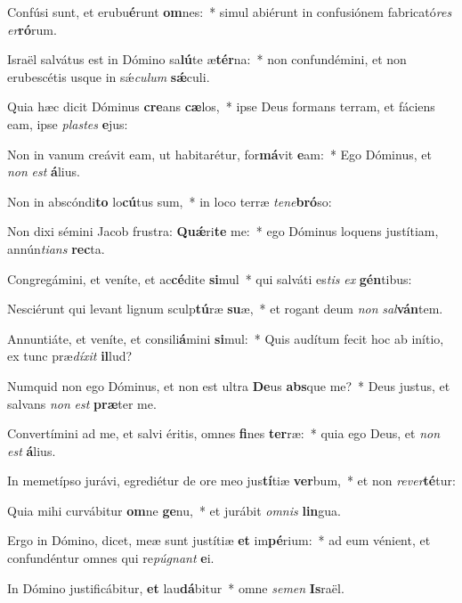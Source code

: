 \item Confúsi sunt, et erubu\textbf{é}runt \textbf{om}nes:~* simul abiérunt in confusiónem fabricató\textit{res} \textit{er}\textbf{ró}rum.
\item Israël salvátus est in Dómino sa\textbf{lú}te æ\textbf{tér}na:~* non confundémini, et non erubescétis usque in sǽ\textit{cu}\textit{lum} \textbf{sǽ}culi.
\item Quia hæc dicit Dóminus \textbf{cre}ans \textbf{cæ}los,~* ipse Deus formans terram, et fáciens eam, ipse \textit{plas}\textit{tes} \textbf{e}jus:
\item Non in vanum creávit eam, ut habitarétur, for\textbf{má}vit \textbf{e}am:~* Ego Dóminus, et \textit{non} \textit{est} \textbf{á}lius.
\item Non in abscóndi\textbf{to} lo\textbf{cú}tus sum,~* in loco terræ \textit{te}\textit{ne}\textbf{bró}so:
\item Non dixi sémini Jacob frustra: \textbf{Quǽ}ri\textbf{te} me:~* ego Dóminus loquens justítiam, annún\textit{ti}\textit{ans} \textbf{rec}ta.
\item Congregámini, et veníte, et ac\textbf{cé}dite \textbf{si}mul~* qui salváti es\textit{tis} \textit{ex} \textbf{gén}tibus:
\item Nesciérunt qui levant lignum sculp\textbf{tú}ræ \textbf{su}æ,~* et rogant deum \textit{non} \textit{sal}\textbf{ván}tem.
\item Annuntiáte, et veníte, et consili\textbf{á}mini \textbf{si}mul:~* Quis audítum fecit hoc ab inítio, ex tunc præ\textit{dí}\textit{xit} \textbf{il}lud?
\item Numquid non ego Dóminus, et non est ultra \textbf{De}us \textbf{abs}que me?~* Deus justus, et salvans \textit{non} \textit{est} \textbf{præ}ter me.
\item Convertímini ad me, et salvi éritis, omnes \textbf{fi}nes \textbf{ter}ræ:~* quia ego Deus, et \textit{non} \textit{est} \textbf{á}lius.
\item In memetípso jurávi, egrediétur de ore meo jus\textbf{tí}tiæ \textbf{ver}bum,~* et non \textit{re}\textit{ver}\textbf{té}tur:
\item Quia mihi curvábitur \textbf{om}ne \textbf{ge}nu,~* et jurábit \textit{om}\textit{nis} \textbf{lin}gua.
\item Ergo in Dómino, dicet, meæ sunt justítiæ \textbf{et} im\textbf{pé}rium:~* ad eum vénient, et confundéntur omnes qui re\textit{pú}\textit{gnant} \textbf{e}i.
\item In Dómino justificábitur, \textbf{et} lau\textbf{dá}bitur~* omne \textit{se}\textit{men} \textbf{Is}raël.
